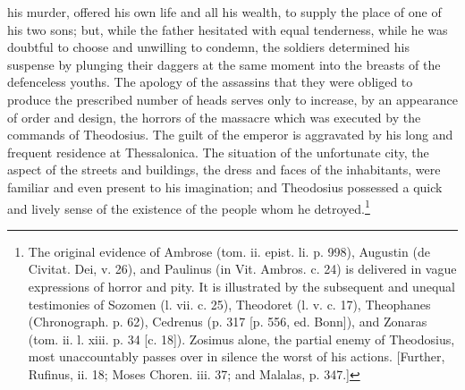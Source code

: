 his murder, offered his own life and all his wealth, to supply the place of one of his two sons; but, while the father hesitated with equal tenderness, while he was doubtful to choose and unwilling to condemn, the soldiers determined his suspense by plunging their daggers at the same moment into the breasts of the defenceless youths. The apology of the assassins that they were obliged to produce the prescribed number of heads serves only to increase, by an appearance of order and design, the horrors of the massacre which was executed by the commands of Theodosius. The guilt of the emperor is aggravated by his long and frequent residence at Thessalonica. The situation of the unfortunate city, the aspect of the streets and buildings, the dress and faces of the inhabitants, were familiar and even present to his imagination; and Theodosius possessed a quick and lively sense of the existence of the people whom he detroyed.\footnote{The original evidence of Ambrose (tom. ii. epist. li. p. 998), Augustin (de Civitat. Dei, v. 26), and Paulinus (in Vit. Ambros. c. 24) is delivered in vague expressions of horror and pity. It is illustrated by the subsequent and unequal testimonies of Sozomen (l. vii. c. 25), Theodoret (l. v. c. 17), Theophanes (Chronograph. p. 62), Cedrenus (p. 317 [p. 556, ed. Bonn]), and Zonaras (tom. ii. l. xiii. p. 34 [c. 18]). Zosimus alone, the partial enemy of Theodosius, most unaccountably passes over in silence the worst of his actions. [Further, Rufinus, ii. 18; Moses Choren. iii. 37; and Malalas, p. 347.]}

